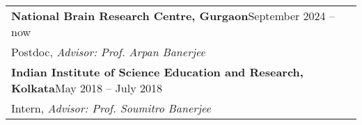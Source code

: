 

\noindent
\begin{tabular}{@{} m{18.5cm}}
\textbf{National Brain Research Centre, Gurgaon}\hfill September 2024 -- now\\
Postdoc, \textit{Advisor: Prof. Arpan Banerjee}\\[0.3cm]

\textbf{Indian Institute of Science Education and Research, Kolkata}\hfill May 2018 -- July 2018 \\
Intern, \textit{Advisor: Prof. Soumitro Banerjee}
\end{tabular}